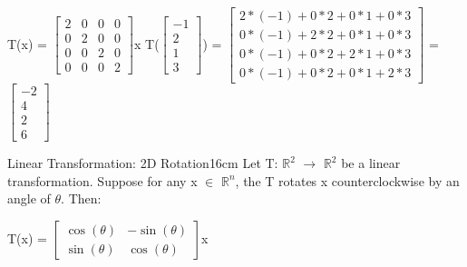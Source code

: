     \begin{tbox}
        T(x) =
        $\begin{bmatrix}
            2 & 0 & 0 & 0 \\
            0 & 2 & 0 & 0 \\
            0 & 0 & 2 & 0 \\
            0 & 0 & 0 & 2 
        \end{bmatrix}$x
        \hspace{1cm}
        T($\begin{bmatrix}
                -1 \\
                2 \\
                1 \\
                3
            \end{bmatrix}$)
        = $\begin{bmatrix}
                2*(-1)+0*2+0*1+0*3 \\
                0*(-1)+2*2+0*1+0*3 \\
                0*(-1)+0*2+2*1+0*3 \\
                0*(-1)+0*2+0*1+2*3
            \end{bmatrix}$
        = $\begin{bmatrix}
                -2 \\
                4 \\
                2 \\
                6
            \end{bmatrix}$
    \end{tbox}

    \newpage



    \begin{corollary}{Linear Transformation: 2D Rotation}{16cm}
        Let T: $\mathbb{R}^2$ $\rightarrow$ $\mathbb{R}^2$
        be a linear transformation. Suppose for any x $\in$ $\mathbb{R}^n$,
        the T rotates x counterclockwise by an angle of $\theta$. Then:

        \hspace{0.5cm}
        T(x) =
        $\begin{bmatrix}
            \cos(\theta) & -\sin(\theta) \\
            \sin(\theta) & \cos(\theta)
        \end{bmatrix}$x
    \end{corollary}

